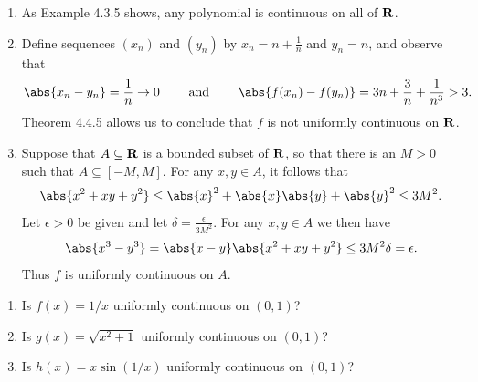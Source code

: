 \documentclass{lew98_solutions}
\begin{document}
\begin{solution}
    \begin{enumerate}
        \item As Example 4.3.5 shows, any polynomial is continuous on all of \( \mathbf{R} \).

        \item Define sequences \( (x_n) \) and \( (y_n) \) by \( x_n = n + \tfrac{1}{n} \) and \( y_n = n \), and observe that
        \[
            \abs{x_n - y_n} = \frac{1}{n} \to 0 \hspaceand \abs{f(x_n) - f(y_n)} = 3n + \frac{3}{n} + \frac{1}{n^3} > 3.
        \]
        Theorem 4.4.5 allows us to conclude that \( f \) is not uniformly continuous on \( \mathbf{R} \).

        \item Suppose that \( A \subseteq \mathbf{R} \) is a bounded subset of \( \mathbf{R} \), so that there is an \( M > 0 \) such that \( A \subseteq [-M, M] \). For any \( x, y \in A \), it follows that
        \[
            \abs{x^2 + xy + y^2} \leq \abs{x}^2 + \abs{x} \abs{y} + \abs{y}^2 \leq 3M^2.
        \]
        Let \( \epsilon > 0 \) be given and let \( \delta = \tfrac{\epsilon}{3M^2} \). For any \( x, y \in A \) we then have
        \[
            \abs{x^3 - y^3} = \abs{x - y} \abs{x^2 + xy + y^2} \leq 3M^2 \delta = \epsilon.
        \]
        Thus \( f \) is uniformly continuous on \( A \).
    \end{enumerate}
\end{solution}

\begin{exercise}
\label{ex:4.4.2}
    \begin{enumerate}
        \item Is \( f(x) = 1 / x \) uniformly continuous on \( (0, 1) \)?

        \item Is \( g(x) = \sqrt{x^2 + 1} \) uniformly continuous on \( (0, 1) \)?

        \item Is \( h(x) = x \sin (1 / x) \) uniformly continuous on \( (0, 1) \)?
    \end{enumerate}
\end{exercise}
\end{document}
